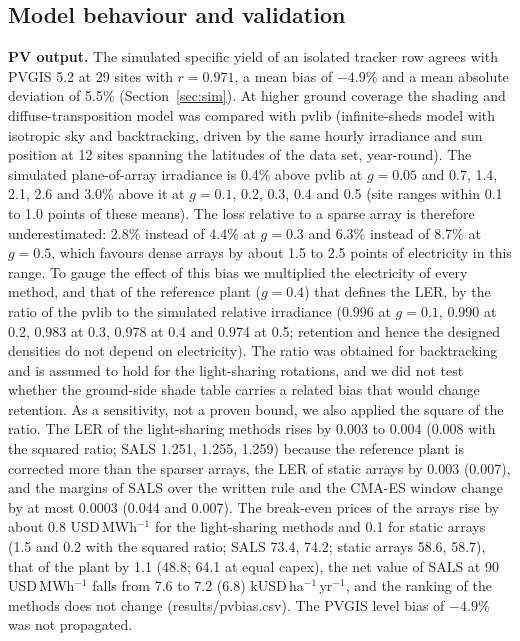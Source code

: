 \subsection{Model behaviour and validation}\label{sec:shade}
\textbf{PV output.} The simulated specific yield of an isolated tracker row agrees with PVGIS 5.2 \citep{pvgis} at 29 sites with $r=0.971$, a mean bias of $-4.9$\% and a mean absolute deviation of 5.5\% (Section~\ref{sec:sim}). At higher ground coverage the shading and diffuse-transposition model was compared with pvlib \citep{holmgren2018} (infinite-sheds model with isotropic sky and backtracking, driven by the same hourly irradiance and sun position at 12 sites spanning the latitudes of the data set, year-round). The simulated plane-of-array irradiance is 0.4\% above pvlib at $g=0.05$ and 0.7, 1.4, 2.1, 2.6 and 3.0\% above it at $g=0.1$, 0.2, 0.3, 0.4 and 0.5 (site ranges within 0.1 to 1.0 points of these means). The loss relative to a sparse array is therefore underestimated: 2.8\% instead of 4.4\% at $g=0.3$ and 6.3\% instead of 8.7\% at $g=0.5$, which favours dense arrays by about 1.5 to 2.5 points of electricity in this range. To gauge the effect of this bias we multiplied the electricity of every method, and that of the reference plant ($g=0.4$) that defines the LER, by the ratio of the pvlib to the simulated relative irradiance (0.996 at $g=0.1$, 0.990 at 0.2, 0.983 at 0.3, 0.978 at 0.4 and 0.974 at 0.5; retention and hence the designed densities do not depend on electricity). The ratio was obtained for backtracking and is assumed to hold for the light-sharing rotations, and we did not test whether the ground-side shade table carries a related bias that would change retention. As a sensitivity, not a proven bound, we also applied the square of the ratio. The LER of the light-sharing methods rises by 0.003 to 0.004 (0.008 with the squared ratio; SALS 1.251, 1.255, 1.259) because the reference plant is corrected more than the sparser arrays, the LER of static arrays by 0.003 (0.007), and the margins of SALS over the written rule and the CMA-ES window change by at most 0.0003 (0.044 and 0.007). The break-even prices of the arrays rise by about 0.8 USD\,MWh$^{-1}$ for the light-sharing methods and 0.1 for static arrays (1.5 and 0.2 with the squared ratio; SALS 73.4, 74.2; static arrays 58.6, 58.7), that of the plant by 1.1 (48.8; 64.1 at equal capex), the net value of SALS at 90 USD\,MWh$^{-1}$ falls from 7.6 to 7.2 (6.8) kUSD\,ha$^{-1}$\,yr$^{-1}$, and the ranking of the methods does not change (results/pvbias.csv). The PVGIS level bias of $-4.9$\% was not propagated.

